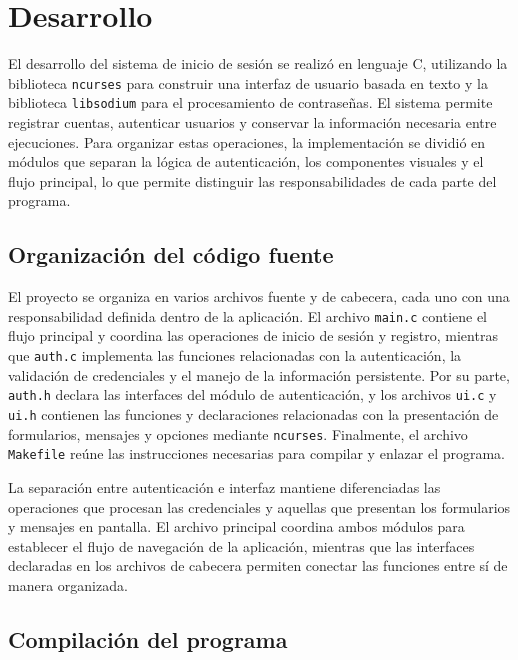 \section{Desarrollo}

El desarrollo del sistema de inicio de sesión se realizó en lenguaje C, utilizando la biblioteca \texttt{ncurses} para construir una interfaz de usuario basada en texto y la biblioteca \texttt{libsodium} para el procesamiento de contraseñas.
El sistema permite registrar cuentas, autenticar usuarios y conservar la información necesaria entre ejecuciones.
Para organizar estas operaciones, la implementación se dividió en módulos que separan la lógica de autenticación, los componentes visuales y el flujo principal, lo que permite distinguir las responsabilidades de cada parte del programa.

\subsection{Organización del código fuente}

El proyecto se organiza en varios archivos fuente y de cabecera, cada uno con una responsabilidad definida dentro de la aplicación.
El archivo \texttt{main.c} contiene el flujo principal y coordina las operaciones de inicio de sesión y registro, mientras que \texttt{auth.c} implementa las funciones relacionadas con la autenticación, la validación de credenciales y el manejo de la información persistente.
Por su parte, \texttt{auth.h} declara las interfaces del módulo de autenticación, y los archivos \texttt{ui.c} y \texttt{ui.h} contienen las funciones y declaraciones relacionadas con la presentación de formularios, mensajes y opciones mediante \texttt{ncurses}.
Finalmente, el archivo \texttt{Makefile} reúne las instrucciones necesarias para compilar y enlazar el programa.

La separación entre autenticación e interfaz mantiene diferenciadas las operaciones que procesan las credenciales y aquellas que presentan los formularios y mensajes en pantalla.
El archivo principal coordina ambos módulos para establecer el flujo de navegación de la aplicación, mientras que las interfaces declaradas en los archivos de cabecera permiten conectar las funciones entre sí de manera organizada.

\subsection{Compilación del programa}

